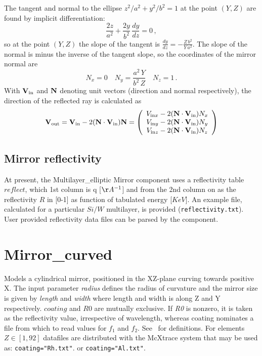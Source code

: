 The tangent and normal to the ellipse $z^2/a^2 + y^2/b^2=1$ at the
point $(Y,Z)$ are found by implicit differentiation: \begin{equation} 
\frac{2z}{a^2} + \frac{2y}{b^2} \,\frac{dy}{dz} = 0\,, \end{equation} so at the
point $(Y,Z)$ the slope of the tangent is $\frac{dy}{dz} =
-\frac{Z\,b^2}{Y\,a^2}$. The slope of the normal is minus the
inverse of the tangent slope, so the coordinates of the mirror
normal are \begin{equation} N_x = 0 \quad N_y = \frac{a^2\,Y}{b^2\,Z} \quad N_z =
1\,. \end{equation} With $\bf{V}_\textrm{in}$ and $\bf{N}$ denoting unit
vectors (direction and normal respectively), the direction of the
reflected ray is calculated as \begin{equation} {\bf{V}}_\textrm{out} =
{\bf{V}}_\textrm{in} -2({\bf{N}}\cdot{\bf{V}}_\textrm{in}){\bf{N}} =
        \left(
      \begin{array}{c}
        V_{\textrm{in}x} - 2({\bf{N}}\cdot{\bf{V}}_\textrm{in})N_x \\
               V_{\textrm{in}y} - 2({\bf{N}}\cdot{\bf{V}}_\textrm{in})N_y \\
                V_{\textrm{in}z} - 2({\bf{N}}\cdot{\bf{V}}_\textrm{in})N_z \\
      \end{array}
    \right)
\end{equation}


\subsection{Mirror reflectivity}
\label{ss:mirrorreflecttable}

At present, the Multilayer\_elliptic Mirror component uses a reflectivity table $reflect$, 
which 1st column is q [$\AA^{-1}$] and from the 2nd column on as the reflectivity $R$ in [0-1]
as function of tabulated energy [$KeV$]. 
An example file, calculated for a particular $Si/W$ multilayer, is provided (\verb+reflectivity.txt+).
User provided reflectivity data files can be parsed by the component.



\section{Mirror\_curved}
\label{mirror-curved}
 
Models a cylindrical mirror, positioned in the XZ-plane curving towards
positive X. The input parameter \textit{radius} defines the radius of curvature
and the mirror size is given by \textit{length} and \textit{width} where length
and width is along Z and Y respectively. $coating$ and $R0$ are mutually
exclusive. If \textit{R0} is nonzero, it is taken as the reflectivity value,
irrespective of wavelength, whereas coating nominates a file from which to read
values for $f_1$ and $f_2$. See~\cite{NIST-ffast} for definitions. For
elements $Z\in[1,92]$ datafiles are distributed with the McXtrace system that
may be used as: \verb+coating="Rh.txt"+. or \verb+coating="Al.txt"+. 
